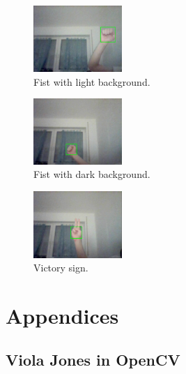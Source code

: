 \documentclass[a4paper]{article}
\begin{document}
\begin{multicols}{3}

\begin{figure}[H]
    \centering
    \includegraphics[width=0.3\textwidth]{img/hand_detector_out1.png}
    \caption{Fist with light background. }
\end{figure}
\columnbreak

\begin{figure}[H]
    \centering
    \includegraphics[width=0.3\textwidth]{img/hand_detector_out2.png}
    \caption{Fist with dark background.}
\end{figure}
\columnbreak

\begin{figure}[H]
    \centering
    \includegraphics[width=0.3\textwidth]{img/hand_detector_out3.png}
    \caption{Victory sign.}
\end{figure}
\end{multicols}



\newpage
\appendix

\section{Appendices}

\newpage
\subsection{Viola Jones in OpenCV}
\label{app:viola_jones_cv}
\end{document}

